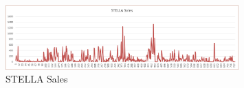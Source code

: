 \begin{figure}[H]
    \centering
    \includegraphics[width=0.8\textwidth]{assets/stella.png}
    \caption{STELLA Sales}
    \label{fig:stella_sales}
    \end{figure}

